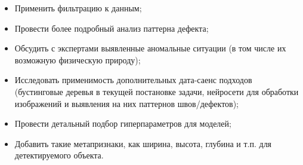 \documentclass[a4paper,article,14pt]{extarticle}
\begin{document}
\begin{itemize}
    \item Применить фильтрацию к данным;
    \item Провести более подробный анализ паттерна дефекта;
    \item Обсудить с экспертами выявленные аномальные ситуации (в том числе их возможную физическую природу);
    \item Исследовать применимость дополнительных дата-саенс подходов (бустинговые деревья в текущей постановке задачи, нейросети для обработки изображений и выявления на них паттернов швов/дефектов);
    \item Провести детальный подбор гиперпараметров для моделей;
    \item Добавить такие метапризнаки, как ширина, высота, глубина и т.п. для детектируемого объекта.
\end{itemize}
\pagebreak
\end{document}

